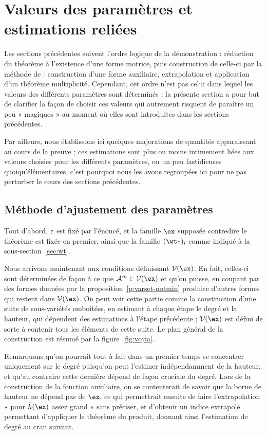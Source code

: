 
\section{Valeurs des paramètres et estimations reliées}
\label{sec:vojta-adjust}

Les sections précédentes suivent l'ordre logique de la démonstration :
réduction du théorème à l'existence d'une forme motrice, puis construction
de celle-ci par la méthode de \TS : construction d'une forme auxiliaire,
extrapolation et application d'un théorème multiplicité. Cependant, cet ordre
n'est pas celui dans lequel les valeurs des différents paramètres sont
déterminés ; la présente section a pour but de clarifier la façon de choisir
ces valeurs qui autrement risquent de paraître un peu « magiques » au moment
où elles sont introduites dans les sections précédentes.

Par ailleurs, nous établissons ici quelques majorations  de
quantités apparaissant au cours de la preuve ; ces estimations sont plus ou
moins intimement liées aux valeurs choisies pour les différents paramètres, ou
un peu fastidieuses quoiqu'élémentaires, c'est pourquoi nous les avons
regroupées ici pour ne pas perturber le cours des sections précédentes.


\subsection{Méthode d'ajustement des paramètres}

Tout d'abord, \( \varepsilon \) est fixé par l'énoncé, et la famille \( \ex \)
supposée contredire le théorème est fixée en premier, ainsi que la famille \(
  (\wt*)_\fct \) comme indiqué à la sous-section~\vref{sec:wt}.

Nous arrivons maintenant aux conditions définissant \( \varset(\ex) \). En
fait, celles-ci sont déterminées de façon à ce que \( \va^\puiss \in
  \varset(\ex) \) et qu'on puisse, en coupant par des formes données par la
proposition~\vref{p:varset-notmin} produire d'autres formes qui restent dans \(
  \varset(\ex) \). On peut voir cette partie comme la construction d'une
suite de sous-variétés emboîtées, en estimant à chaque étape le degré et la
hauteur, qui dépendent des estimations à l'étape précédente ; \( \varset(\ex)
\) est défini de sorte à contenir tous les éléments de cette suite. Le plan
général de la construction est résumé par la figure~\vref{fig:vojta}.
\afterpage{}

Remarquons qu'on pourrait tout à fait dans un premier temps se concentrer
uniquement sur le degré puisqu'on peut l'estimer indépendamment de la hauteur,
et qu'au contraire cette dernière dépend de façon cruciale du degré. Lors de
la construction de la fonction auxiliaire, on se contenterait de savoir que la
borne de hauteur ne dépend pas de \( \ex \), ce qui permettrait ensuite de
faire l'extrapolation « pour \( \hautn\ex \) assez grand » sans préciser, et
d'obtenir un indice extrapolé permettant d'appliquer le théorème du produit,
donnant ainsi l'estimation de degré au cran suivant.


